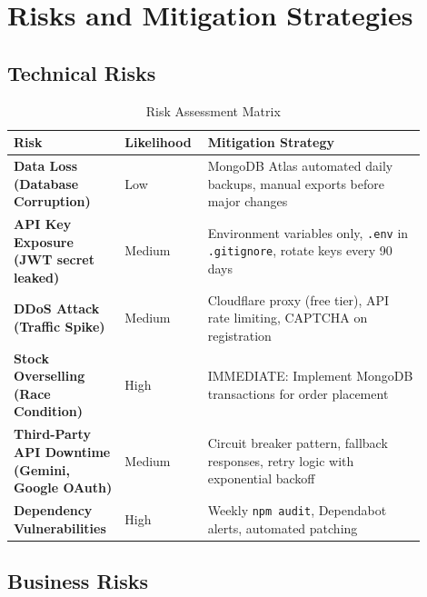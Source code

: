 \documentclass[12pt, a4paper]{report}
\begin{document}
\section{Risks and Mitigation Strategies}

\subsection{Technical Risks}

\begin{table}[H]
\centering
\caption{Risk Assessment Matrix}
\label{tab:risk_matrix}
\small
\begin{tabular}{@{}p{0.25\linewidth}p{0.15\linewidth}p{0.50\linewidth}@{}}
\toprule
\textbf{Risk} & \textbf{Likelihood} & \textbf{Mitigation Strategy} \\
\midrule
\textbf{Data Loss (Database Corruption)} & Low & MongoDB Atlas automated daily backups, manual exports before major changes \\
\textbf{API Key Exposure (JWT secret leaked)} & Medium & Environment variables only, \texttt{.env} in \texttt{.gitignore}, rotate keys every 90 days \\
\textbf{DDoS Attack (Traffic Spike)} & Medium & Cloudflare proxy (free tier), API rate limiting, CAPTCHA on registration \\
\textbf{Stock Overselling (Race Condition)} & High & IMMEDIATE: Implement MongoDB transactions for order placement \\
\textbf{Third-Party API Downtime (Gemini, Google OAuth)} & Medium & Circuit breaker pattern, fallback responses, retry logic with exponential backoff \\
\textbf{Dependency Vulnerabilities} & High & Weekly \texttt{npm audit}, Dependabot alerts, automated patching \\
\bottomrule
\end{tabular}
\end{table}

\subsection{Business Risks}
\end{document}
